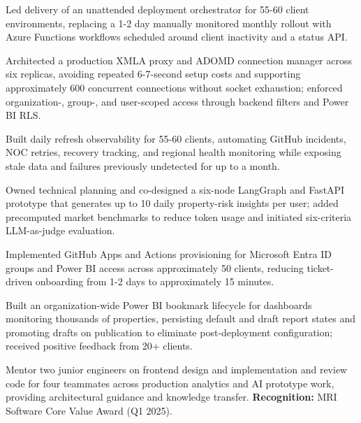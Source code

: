 \vspace{1.5mm}
\resumeItemListStart
    \item{Led delivery of an unattended deployment orchestrator for 55-60 client environments, replacing a 1-2 day manually monitored monthly rollout with Azure Functions workflows scheduled around client inactivity and a status API.}
    \item{Architected a production XMLA proxy and ADOMD connection manager across six replicas, avoiding repeated 6-7-second setup costs and supporting approximately 600 concurrent connections without socket exhaustion; enforced organization-, group-, and user-scoped access through backend filters and Power BI RLS.}
    \item{Built daily refresh observability for 55-60 clients, automating GitHub incidents, NOC retries, recovery tracking, and regional health monitoring while exposing stale data and failures previously undetected for up to a month.}
    \item{Owned technical planning and co-designed a six-node LangGraph and FastAPI prototype that generates up to 10 daily property-risk insights per user; added precomputed market benchmarks to reduce token usage and initiated six-criteria LLM-as-judge evaluation.}
    \item{Implemented GitHub Apps and Actions provisioning for Microsoft Entra ID groups and Power BI access across approximately 50 clients, reducing ticket-driven onboarding from 1-2 days to approximately 15 minutes.}
    \item{Built an organization-wide Power BI bookmark lifecycle for dashboards monitoring thousands of properties, persisting default and draft report states and promoting drafts on publication to eliminate post-deployment configuration; received positive feedback from 20+ clients.}
    \item{Mentor two junior engineers on frontend design and implementation and review code for four teammates across production analytics and AI prototype work, providing architectural guidance and knowledge transfer.}
\resumeItemListEnd
\noindent\hspace{3ex}\small{\textbf{Recognition:} MRI Software Core Value Award (Q1 2025).}
